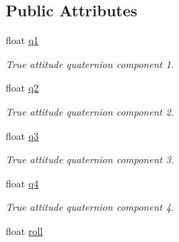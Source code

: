 \subsection*{Public Attributes}
\begin{DoxyCompactItemize}
\item 
\hypertarget{struct____mavlink__sim__state__t_a9dfbea689e2c7698c3a261f6802c8e1f}{float \hyperlink{struct____mavlink__sim__state__t_a9dfbea689e2c7698c3a261f6802c8e1f}{q1}}\label{struct____mavlink__sim__state__t_a9dfbea689e2c7698c3a261f6802c8e1f}

\begin{DoxyCompactList}\small\item\em True attitude quaternion component 1. \end{DoxyCompactList}\item 
\hypertarget{struct____mavlink__sim__state__t_a1505c15afe799f4f900ad53c8d55b40c}{float \hyperlink{struct____mavlink__sim__state__t_a1505c15afe799f4f900ad53c8d55b40c}{q2}}\label{struct____mavlink__sim__state__t_a1505c15afe799f4f900ad53c8d55b40c}

\begin{DoxyCompactList}\small\item\em True attitude quaternion component 2. \end{DoxyCompactList}\item 
\hypertarget{struct____mavlink__sim__state__t_a6b8cee23b1ef3cdbd9b501d7288b9a7c}{float \hyperlink{struct____mavlink__sim__state__t_a6b8cee23b1ef3cdbd9b501d7288b9a7c}{q3}}\label{struct____mavlink__sim__state__t_a6b8cee23b1ef3cdbd9b501d7288b9a7c}

\begin{DoxyCompactList}\small\item\em True attitude quaternion component 3. \end{DoxyCompactList}\item 
\hypertarget{struct____mavlink__sim__state__t_ae16cb79acbe95c51bb3a341d0d2ffda1}{float \hyperlink{struct____mavlink__sim__state__t_ae16cb79acbe95c51bb3a341d0d2ffda1}{q4}}\label{struct____mavlink__sim__state__t_ae16cb79acbe95c51bb3a341d0d2ffda1}

\begin{DoxyCompactList}\small\item\em True attitude quaternion component 4. \end{DoxyCompactList}\item 
\hypertarget{struct____mavlink__sim__state__t_a58165fc0ced95f3db6546a9ccacf1705}{float \hyperlink{struct____mavlink__sim__state__t_a58165fc0ced95f3db6546a9ccacf1705}{roll}}\label{struct____mavlink__sim__state__t_a58165fc0ced95f3db6546a9ccacf1705}


\end{DoxyCompactItemize}

